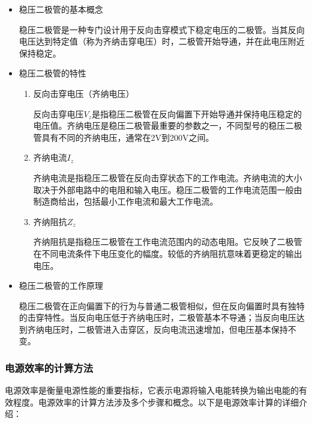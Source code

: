 \documentclass[dvipsnames, svgnames,a4paper,11pt]{article}
\begin{document}
			\begin{itemize}
				\item 稳压二极管的基本概念

					稳压二极管是一种专门设计用于反向击穿模式下稳定电压的二极管。当其反向电压达到特定值（称为齐纳击穿电压）时，二极管开始导通，并在此电压附近保持稳定。

				\item 稳压二极管的特性
				
					\begin{enumerate}
						\item 反向击穿电压（齐纳电压）
						
							反向击穿电压$V_z$是指稳压二极管在反向偏置下开始导通并保持电压稳定的电压值。齐纳电压是稳压二极管最重要的参数之一，不同型号的稳压二极管具有不同的齐纳电压，通常在2V到200V之间。

						\item  齐纳电流$I_z$
						
							齐纳电流是指稳压二极管在反向击穿状态下的工作电流。齐纳电流的大小取决于外部电路中的电阻和输入电压。稳压二极管的工作电流范围一般由制造商给出，包括最小工作电流和最大工作电流。

						\item 齐纳阻抗$Z_z$
						
							齐纳阻抗是指稳压二极管在工作电流范围内的动态电阻。它反映了二极管在不同电流条件下电压变化的幅度。较低的齐纳阻抗意味着更稳定的输出电压。

					
					\end{enumerate}

				\item 稳压二极管的工作原理
					
					稳压二极管在正向偏置下的行为与普通二极管相似，但在反向偏置时具有独特的击穿特性。当反向电压低于齐纳电压时，二极管基本不导通；当反向电压达到齐纳电压时，二极管进入击穿区，反向电流迅速增加，但电压基本保持不变。
			\end{itemize}








		\subsubsection*{电源效率的计算方法}

			电源效率是衡量电源性能的重要指标，它表示电源将输入电能转换为输出电能的有效程度。电源效率的计算方法涉及多个步骤和概念。以下是电源效率计算的详细介绍：
\end{document}
